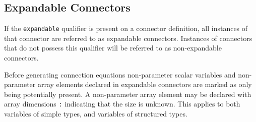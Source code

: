\subsection{Expandable Connectors}\label{expandable-connectors}

If the \lstinline!expandable! qualifier is present on a connector definition, all
instances of that connector are referred to as expandable connectors.
Instances of connectors that do not possess this qualifier will be
referred to as non-expandable connectors.

Before generating connection equations non-parameter scalar variables
and non-parameter array elements declared in expandable connectors are
marked as only being potentially present. A non-parameter array element
may be declared with array dimensions \lstinline!:! indicating that the size is
unknown. This applies to both variables of simple types, and variables
of structured types.

